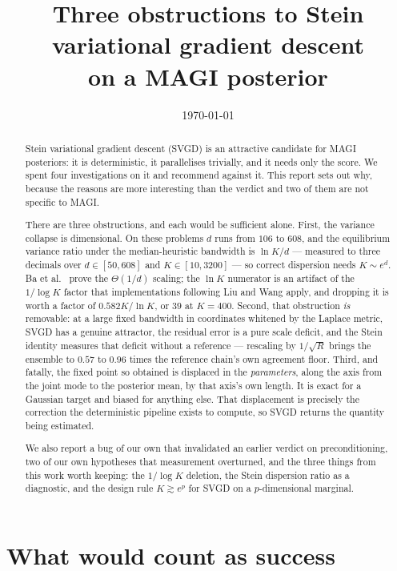 \documentclass[11pt]{article}
\title{\bfseries Three obstructions to Stein variational gradient descent\\[2pt]
on a MAGI posterior}
\author{}
\date{\today}
\theoremstyle{remark}
\begin{document}
\maketitle

\begin{abstract}
\noindent
Stein variational gradient descent (SVGD) is an attractive candidate for MAGI \cite{yang2021}
posteriors: it is deterministic, it parallelises trivially, and it needs only the score. We spent
four investigations on it and recommend against it. This report sets out why, because the reasons
are more interesting than the verdict and two of them are not specific to MAGI.

There are three obstructions, and each would be sufficient alone. First, the variance collapse is
dimensional. On these problems $d$ runs from $106$ to $608$, and the equilibrium variance ratio
under the median-heuristic bandwidth is $\ln K/d$ --- measured to three decimals over $d \in
[50, 608]$ and $K \in [10, 3200]$ --- so correct dispersion needs $K \sim e^{d}$. Ba et
al.\ \cite{ba2022} prove the $\Theta(1/d)$ scaling; the $\ln K$ numerator is an artifact of the
$1/\log K$ factor that implementations following Liu and Wang \cite{liu2016} apply, and dropping it
is worth a factor of $0.582K/\ln K$, or $39$ at $K = 400$. Second, that obstruction \emph{is}
removable: at a large fixed bandwidth in coordinates whitened by the Laplace metric, SVGD has a
genuine attractor, the residual error is a pure scale deficit, and the Stein identity measures that
deficit without a reference --- rescaling by $1/\sqrt{R}$ brings the ensemble to $0.57$ to $0.96$
times the reference chain's own agreement floor. Third, and fatally, the fixed point so obtained is
displaced in the \emph{parameters}, along the axis from the joint mode to the posterior mean, by
that axis's own length. It is exact for a Gaussian target and biased for anything else. That
displacement is precisely the correction the deterministic pipeline exists to compute, so SVGD
returns the quantity being estimated.

We also report a bug of our own that invalidated an earlier verdict on preconditioning, two of our
own hypotheses that measurement overturned, and the three things from this work worth keeping: the
$1/\log K$ deletion, the Stein dispersion ratio as a diagnostic, and the design rule
$K \gtrsim e^{p}$ for SVGD on a $p$-dimensional marginal.
\end{abstract}

\section{What would count as success}
\label{sec:setting}
\end{document}
